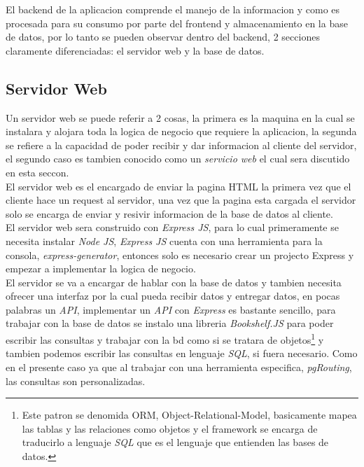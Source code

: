 El backend de la aplicacion comprende el manejo de la informacion y como es procesada para su consumo por parte del frontend y almacenamiento en la base de datos, por lo tanto se pueden observar dentro del backend, 2 secciones claramente diferenciadas: el servidor web y la base de datos.\\




\subsection{Servidor Web}
\label{sub:servidor_web}

Un servidor web se puede referir a 2 cosas, la primera es la maquina en la cual se instalara y alojara toda la logica de negocio que requiere la aplicacion, la segunda se refiere a la capacidad de poder recibir y dar informacion al cliente del servidor, el segundo caso es tambien conocido como un \emph{servicio web} el cual sera discutido en esta seccon.\\

El servidor web es el encargado de enviar la pagina HTML la primera vez que el cliente hace un request al servidor, una vez que la pagina esta cargada el servidor solo se encarga de enviar y resivir informacion de la base de datos al cliente.\\

El servidor web sera construido con \emph{Express JS}, para lo cual primeramente se necesita instalar \emph{Node JS}, \emph{Express JS} cuenta con una herramienta para la consola, \emph{express-generator}, entonces solo es necesario crear un projecto Express y empezar a implementar la logica de negocio.\\

El servidor se va a encargar de hablar con la base de datos y tambien necesita ofrecer una interfaz por la cual pueda recibir datos y entregar datos, en pocas palabras un \emph{API}, implementar un \emph{API} con \emph{Express} es bastante sencillo, para trabajar con la base de datos se instalo una libreria \emph{Bookshelf.JS} para poder escribir las consultas y trabajar con la bd como si se tratara de objetos\footnote{Este patron se denomida ORM, Object-Relational-Model, basicamente mapea las tablas y las relaciones como objetos y el framework se encarga de traducirlo a lenguaje \emph{SQL} que es el lenguaje que entienden las bases de datos.} y tambien podemos escribir las consultas en lenguaje \emph{SQL}, si fuera necesario. Como en el presente caso ya que al  trabajar con una herramienta especifica, \emph{pgRouting}, las consultas son personalizadas.\\

